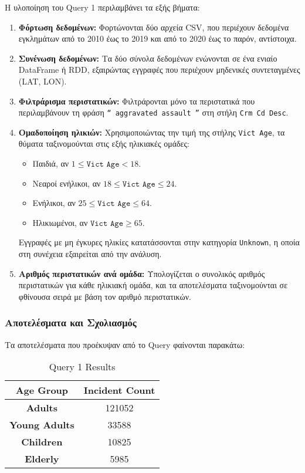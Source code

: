\documentclass{article}
\begin{document}
Η υλοποίηση του Query 1 περιλαμβάνει τα εξής βήματα:
\begin{enumerate}
    \item \textbf{Φόρτωση δεδομένων:} Φορτώνονται δύο αρχεία CSV, που περιέχουν δεδομένα εγκλημάτων από το 2010 έως το 2019 και από το 2020 έως το παρόν, αντίστοιχα. 
    \item \textbf{Συνένωση δεδομένων:} Τα δύο σύνολα δεδομένων ενώνονται σε ένα ενιαίο DataFrame ή RDD, εξαιρώντας εγγραφές που περιέχουν μηδενικές συντεταγμένες (LAT, LON).
    \item \textbf{Φιλτράρισμα περιστατικών:} Φιλτράρονται μόνο τα περιστατικά που περιλαμβάνουν τη φράση \texttt{“ aggravated assault ”} στη στήλη \texttt{Crm Cd Desc}.
    \item \textbf{Ομαδοποίηση ηλικιών:} Χρησιμοποιώντας την τιμή της στήλης \texttt{Vict Age}, τα θύματα ταξινομούνται στις εξής ηλικιακές ομάδες:
          \begin{itemize}
              \item Παιδιά, αν $1 \leq \texttt{Vict Age} < 18$.
              \item Νεαροί ενήλικοι, αν $18 \leq \texttt{Vict Age} \leq 24$.
              \item Ενήλικοι, αν $25 \leq \texttt{Vict Age} \leq 64$.
              \item Ηλικιωμένοι, αν $\texttt{Vict Age} \geq 65$.
          \end{itemize}
          Εγγραφές με μη έγκυρες ηλικίες κατατάσσονται στην κατηγορία \texttt{Unknown}, η οποία στη συνέχεια εξαιρείται από την ανάλυση.
    \item \textbf{Αριθμός περιστατικών ανά ομάδα:} Υπολογίζεται ο συνολικός αριθμός περιστατικών για κάθε ηλικιακή ομάδα, και τα αποτελέσματα ταξινομούνται σε φθίνουσα σειρά με βάση τον αριθμό περιστατικών.
\end{enumerate}
\subsubsection*{Αποτελέσματα και Σχολιασμός}
Τα αποτελέσματα που προέκυψαν από το Query φαίνονται παρακάτω: \\
\begin{table}[H]
\centering
\caption{Query 1 Results}
\label{tab:query1_results}
\begin{tabular}{|c|c|}
\hline
\textbf{Age Group}		& 		\textbf{Incident Count}	\\ \hline
\textbf{Adults}			&		121052					\\ \hline
\textbf{Young Adults}	&		33588					\\ \hline
\textbf{Children}      		&		10825					\\ \hline
\textbf{Elderly}			&		5985					\\ \hline
\end{tabular}
\end{table}
\end{document}

